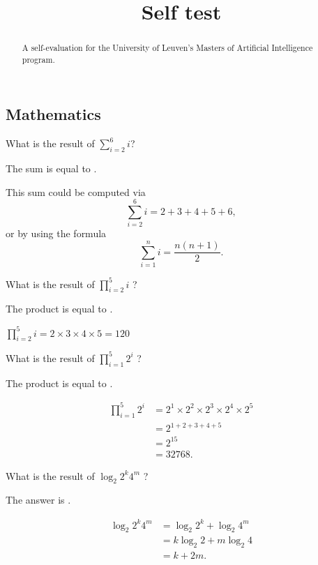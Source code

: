 




\title{Self test}


\begin{abstract}
A self-evaluation for the University of Leuven's Masters of Artificial
Intelligence program.
\end{abstract}
\maketitle

\subsection*{Mathematics}

\begin{question}
What is the result of $\sum_{i=2}^6 i$?
\begin{solution}
The sum is equal to .
\end{solution}
This sum could be computed via
\[
\sum_{i=2}^6 i = 2 + 3 + 4 + 5 + 6,
\]
or by using the formula
\[
\sum_{i=1}^n i = \frac{n(n+1)}{2}.
\]
\end{question}

\begin{question}
What is  the result of $\prod_{i=2}^{5} i$ ? 
\begin{solution}
The product is equal to .
\end{solution}
$\prod_{i=2}^5 i = 2 \times 3 \times 4 \times 5 = 120$
\end{question}

\begin{question}
What is  the result of  $\prod_{i=1}^5 2^i$  ? 
\begin{solution}
The product is equal to .
\end{solution}
\begin{align*}
\prod_{i=1}^5 2^i &= 2^1 \times 2^2 \times 2^3 \times 2^4 \times 2^5 \\
&= 2^{1 + 2 + 3 + 4 + 5} \\
&= 2^{15} \\
&= 32768. 
\end{align*}
\end{question}

\begin{question}
What is  the result of  $\log_2 2^k 4^m$  ? 
\begin{solution}
The answer is .
\end{solution}
\begin{align*}
\log_2{2^k 4^m} &= \log_2{2^k} + \log_2{4^m} \\
&= k \log_2{2} + m \log_2{4} \\
&= k + 2m.
\end{align*}
\end{question}

